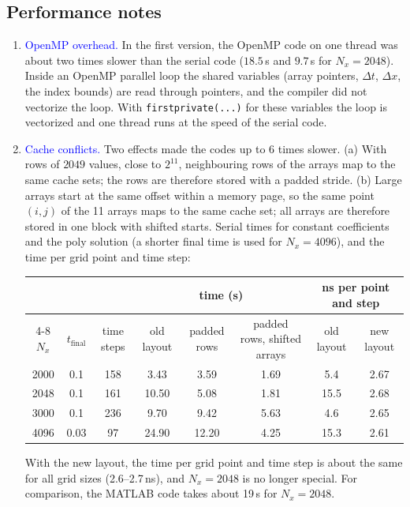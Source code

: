 \documentclass[11pt]{article}
\begin{document}
\subsection{Performance notes}\label{sec:performanceNotes}
\begin{enumerate}
\item \textcolor{blue}{OpenMP overhead.} In the first version, the OpenMP code on one thread was about two times slower than the serial code ($18.5$\,s and $9.7$\,s for $N_x=2048$). Inside an OpenMP parallel loop the shared variables (array pointers, $\Delta t$, $\Delta x$, the index bounds) are read through pointers, and the compiler did not vectorize the loop. With \texttt{firstprivate(...)} for these variables the loop is vectorized and one thread runs at the speed of the serial code.
\item \textcolor{blue}{Cache conflicts.} Two effects made the codes up to 6 times slower. (a) With rows of $2049$ values, close to $2^{11}$, neighbouring rows of the arrays map to the same cache sets; the rows are therefore stored with a padded stride. (b) Large arrays start at the same offset within a memory page, so the same point $(i,j)$ of the 11 arrays maps to the same cache set; all arrays are therefore stored in one block with shifted starts. Serial times for constant coefficients and the poly solution (a shorter final time is used for $N_x=4096$), and the time per grid point and time step:
\begin{table}[H]\footnotesize
\begin{center}
\begin{tabular}{|c|c|c|c|c|c|c|c|} \hline
 & & & \multicolumn{3}{c|}{time (s)} & \multicolumn{2}{c|}{ns per point and step} \\ \cline{4-8}
$N_x$ & $t_{\text{final}}$ & time steps & old layout & padded rows & padded rows, shifted arrays & old layout & new layout \\ \hline
2000 & 0.1 & 158 & 3.43 & 3.59 & 1.69 & 5.4 & 2.67 \\
2048 & 0.1 & 161 & 10.50 & 5.08 & 1.81 & 15.5 & 2.68 \\
3000 & 0.1 & 236 & 9.70 & 9.42 & 5.63 & 4.6 & 2.65 \\
4096 & 0.03 & 97 & 24.90 & 12.20 & 4.25 & 15.3 & 2.61 \\
\hline
\end{tabular}
\end{center}
\end{table}
With the new layout, the time per grid point and time step is about the same for all grid sizes (2.6--2.7\,ns), and $N_x=2048$ is no longer special. For comparison, the MATLAB code takes about 19\,s for $N_x=2048$.

\end{enumerate}
\end{document}
